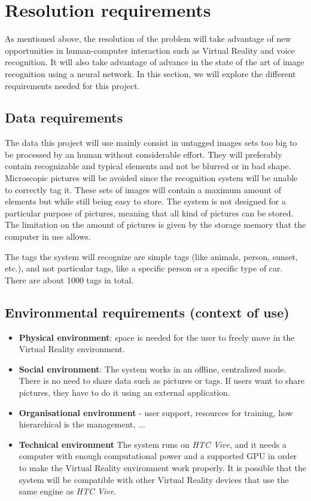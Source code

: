 \documentclass[11pt,a4paper]{article}
\begin{document}
\section{Resolution requirements}

As mentioned above, the resolution of the problem will take advantage of new opportunities in human-computer interaction such as Virtual Reality and voice recognition. It will also take advantage of advance in the state of the art of image recognition using a neural network. In this section, we will explore the different requirements needed for this project.

\subsection{Data requirements}

The data this project will use mainly consist in untagged images sets too big to be processed by an human without considerable effort. They will preferably contain recognizable  and typical elements and not be blurred or in bad shape. Microscopic pictures will be avoided since the recognition system will be unable to correctly tag it. These sets of images will contain a maximum amount of elements but while still being easy to store. 
The system is not designed for a particular purpose of pictures, meaning that all kind of pictures can be stored. The limitation on the amount of pictures is given by the storage memory that the computer in use allows.

The tags the system will recognize are simple tags (like animals, person, sunset, etc.), and not particular tags, like a specific person or a specific type of car. There are about 1000 tags in total.

\subsection{Environmental requirements (context of use)}

\begin{itemize}
\item \textbf{Physical environment}: space is needed for the user to freely move in the Virtual Reality environment.
\item \textbf{Social environment}:
The system works in an offline, centralized mode. There is no need to share data such as pictures or tags. If users want to share pictures, they have to do it using an external application.
\item \textbf{Organisational environment}
- user support, resources for training, how hierarchical is the management, ... 
\item \textbf{Technical environment}
The system runs on \textit{HTC Vive}, and it needs a computer with enough computational power and a supported GPU in order to make the Virtual Reality environment work properly. 
It is possible that the system will be compatible with other Virtual Reality devices that use the same engine as \textit{HTC Vive}.
\end{itemize}
\end{document}
